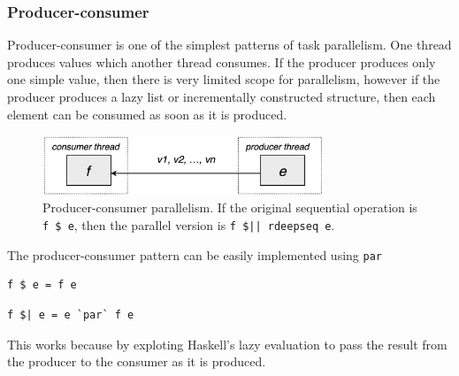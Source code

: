 \documentclass[CS4204-Notes.tex]{subfiles}
\begin{document}
\subsubsection{Producer-consumer}
Producer-consumer is one of the simplest patterns of task parallelism. One thread produces values which another thread consumes. If the producer produces only one simple value, then there is very limited scope for parallelism, however if the producer produces a lazy list or incrementally constructed structure, then each element can be consumed as soon as it is produced.
\begin{figure}[H]
  \centering
  \includegraphics[width=0.75\textwidth, keepaspectratio]{imgs/producer-consumer.png}
  \caption{Producer-consumer parallelism. If the original sequential operation is \texttt{f \$ e}, then the parallel version is \texttt{f \$|| rdeepseq e}.}
\end{figure}
\noindent
The producer-consumer pattern can be easily implemented using \texttt{\textquoteback par\textquoteback}
\n
\begin{minipage}{0.45\textwidth}
\begin{lstlisting}[caption={Sequential producer-consumer}]
f $ e = f e
\end{lstlisting}
\end{minipage}
\hspace*{\fill}
\begin{minipage}{0.45\textwidth}
\begin{lstlisting}[caption={Parallel producer-consumer}]
f $| e = e `par` f e
\end{lstlisting}
\end{minipage}
This works because by exploting Haskell's lazy evaluation to pass the result from the producer to the consumer as it is produced.
\end{document}
